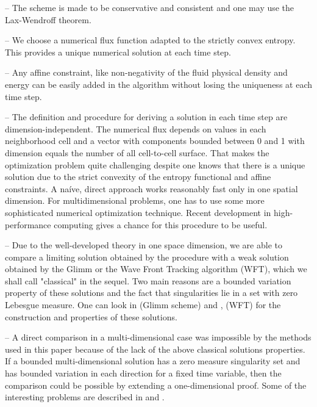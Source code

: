 \documentclass[11pt,a4paper,reqno]{amsart}
\theoremstyle{plain}
\theoremstyle{definition}
\theoremstyle{remark}
\numberwithin{equation}{section}
\begin{document}
\noindent -- The scheme is made to be conservative and consistent and one may use
the Lax-Wendroff theorem. 
\medskip 

\noindent -- We choose a numerical flux function adapted to the strictly convex
entropy. This provides a unique numerical solution at each time step.
\medskip 


\noindent -- Any affine constraint, like non-negativity of the fluid 
physical density and energy can be easily added in the algorithm without 
losing the uniqueness at each time step.

\noindent -- The definition and procedure for deriving a solution in 
each time step are dimension-independent. The numerical flux depends 
on values in each neighborhood cell and a vector with components 
bounded between 0 and 1 with dimension equals the number of all
cell-to-cell surface. That makes the optimization problem quite challenging 
despite one knows that there is a unique solution due to the strict convexity
of the entropy functional and affine constraints. 
A na\'{i}ve, direct approach works reasonably fast only in one spatial dimension. 
For multidimensional problems, one has to use some more sophisticated numerical 
optimization technique. Recent development in high-performance computing 
gives a chance for this procedure to be useful. 
\medskip 

\noindent -- Due to the well-developed theory in one space dimension, we are able
to compare a limiting solution obtained by the procedure with a weak 
solution obtained by the Glimm or the Wave Front Tracking algorithm 
(WFT), which we shall call "classical" in the sequel.
Two main reasons are a bounded variation property of these solutions and the fact
that singularities lie in a set with zero Lebesgue measure. 
One can look in \cite{Diperna} (Glimm scheme) and \cite{Bressan}, 
\cite{Holden-Risebro} (WFT) for the construction and 
properties of these solutions.
\medskip 

\noindent -- A direct comparison in a multi-dimensional case was impossible 
by the methods used in this paper because of the lack of the above classical 
solutions properties.  If a bounded multi-dimensional
solution has a zero measure singularity set and has bounded variation 
in each direction for a fixed time variable, 
then the comparison could be possible 
by extending a one-dimensional proof. Some of the  interesting problems
are described in \cite{DLS2010} and \cite{CK2014}.
\medskip
\end{document}
